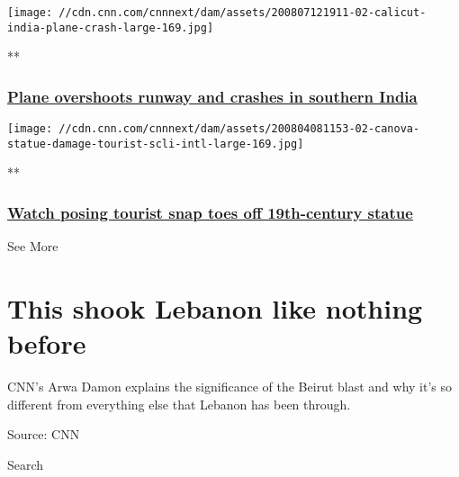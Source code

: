 \href{/videos/world/2020/08/07/plane-crash-kozhikode-international-airport-air-india-express-vedika-sud-intl-vpx.cnn/video/playlists/around-the-world/}{}

\texttt{[image: //cdn.cnn.com/cnnnext/dam/assets/200807121911-02-calicut-india-plane-crash-large-169.jpg]}

**

\hypertarget{plane-overshoots-runway-and-crashes-in-southern-india}{%
\subsubsection{\texorpdfstring{\href{/videos/world/2020/08/07/plane-crash-kozhikode-international-airport-air-india-express-vedika-sud-intl-vpx.cnn/video/playlists/around-the-world/}{Plane
overshoots runway and crashes in southern
India}}{Plane overshoots runway and crashes in southern India}}\label{plane-overshoots-runway-and-crashes-in-southern-india}}

\href{/videos/arts/2020/08/04/tourist-breaks-statue-italy-orig-mrg.cnn/video/playlists/around-the-world/}{}

\texttt{[image: //cdn.cnn.com/cnnnext/dam/assets/200804081153-02-canova-statue-damage-tourist-scli-intl-large-169.jpg]}

**

\hypertarget{watch-posing-tourist-snap-toes-off-19th-century-statue}{%
\subsubsection{\texorpdfstring{\href{/videos/arts/2020/08/04/tourist-breaks-statue-italy-orig-mrg.cnn/video/playlists/around-the-world/}{Watch
posing tourist snap toes off 19th-century
statue}}{Watch posing tourist snap toes off 19th-century statue}}\label{watch-posing-tourist-snap-toes-off-19th-century-statue}}

See More

\hypertarget{this-shook-lebanon-like-nothing-before-2}{%
\section{This shook Lebanon like nothing
before}\label{this-shook-lebanon-like-nothing-before-2}}

CNN's Arwa Damon explains the significance of the Beirut blast and why
it's so different from everything else that Lebanon has been through.

Source: CNN

Search

